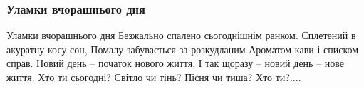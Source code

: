  
 
 

\subsubsection{Уламки вчорашнього дня}

Уламки вчорашнього дня
Безжально спалено сьогоднішнім ранком.
Сплетений в акуратну косу сон,
Помалу забувається за розкудланим
Ароматом кави і списком справ.
Новий день – початок нового життя,
І так щоразу – новий день – нове життя.
Хто ти сьогодні? Світло чи тінь?
Пісня чи тиша? Хто ти?.... 
